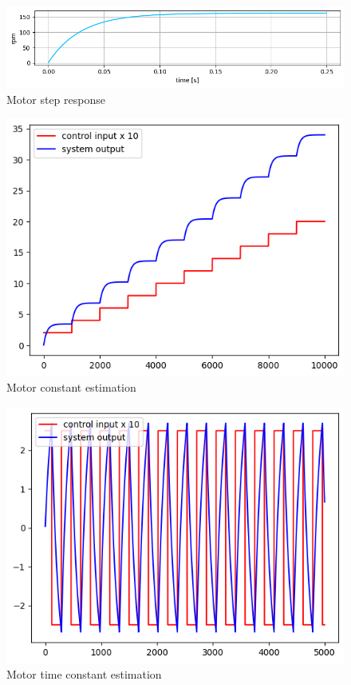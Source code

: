 \documentclass[12pt,twoside,onecolumn,openany,extrafontsizes,dvipsnames]{memoir}
\begin{document}
        \begin{figure}[!htb]
            \centering
            \includegraphics[scale=0.6]{../images/motor_control/motor_step_response.png}
            \caption{Motor step response}
            \label{fig:motor_step_response}
        \end{figure}

        \begin{figure}[!htb]
            \centering
            \includegraphics[scale=0.6]{../images/motor_control/motor_constant_estimation.png}
            \caption{Motor constant estimation}
            \label{fig:motor_constant_estimation}
        \end{figure}

        \begin{figure}[!htb]
            \centering
            \includegraphics[scale=0.6]{../images/motor_control/motor_time_constant_estimation.png}
            \caption{Motor time constant estimation}
            \label{fig:motor_time_constant_estimation}
        \end{figure}
\end{document}
